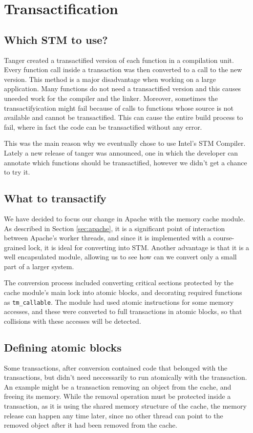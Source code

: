 \documentclass[preprint,11pt]{sigplanconf}
\begin{document}
\section{Transactification}\label{sec:transactification}
\subsection{Which STM to use?}
{\sc Tanger} created a transactified version of each function in a compilation
unit.  Every function call inside a transaction was then converted to a call to
the new version. This method is a major disadvantage when working on a large
application. Many functions do not need a transactified version and this causes
uneeded work for the compiler and the linker. Moreover, sometimes the
transactifyication might fail because of calls to functions whose source is not
available and cannot be transactified. This can cause the entire build process
to fail, where in fact the code can be transactified without any error.

This was the main reason why we eventually chose to use Intel's STM Compiler.
Lately a new release of tanger was announced, one in which the developer can
annotate which functions should be transactified, however we didn't get a
chance to try it.

\subsection{What to transactify}
We have decided to focus our change in Apache with the memory cache module. As
described in Section \ref{sec:apache}, it is a significant point of interaction
between Apache's worker threads, and since it is implemented with a course-grained
lock, it is ideal for converting into STM. Another advantage is that it is a
well encapsulated module, allowing us to see how can we convert only a small
part of a larger system.

The conversion process included converting critical sections protected by the
cache module's main lock into atomic blocks, and decorating required functions
as {\tt tm\_callable}. The module had used atomic instructions for some memory
accesses, and these were converted to full transactions in atomic blocks, so
that collisions with these accesses will be detected.

\subsection{Defining atomic blocks}
Some transactions, after conversion contained code that belonged with the
transactions, but didn't need neccessarily to run atomically with the
transaction. An example might be a transaction removing an object from the
cache, and freeing its memory. While the removal operation must be protected
inside a transaction, as it is using the shared memory structure of the cache,
the memory release can happen any time later, since no other thread can point to
the removed object after it had been removed from the cache. 
\end{document}
